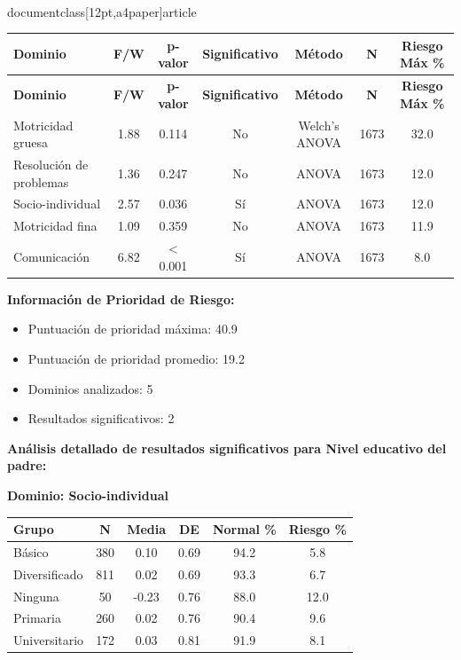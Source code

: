 \\documentclass[12pt,a4paper]{article}
\begin{document}
\begin{longtable}{|l|c|c|c|c|c|c|}
\hline
\textbf{Dominio} & \textbf{F/W} & \textbf{p-valor} & \textbf{Significativo} & \textbf{Método} & \textbf{N} & \textbf{Riesgo Máx \%} \\
\hline
\endfirsthead

\hline
\textbf{Dominio} & \textbf{F/W} & \textbf{p-valor} & \textbf{Significativo} & \textbf{Método} & \textbf{N} & \textbf{Riesgo Máx \%} \\
\hline
\endhead

\hline
\endfoot

\hline
\endlastfoot

Motricidad gruesa & 1.88 & 0.114 & No & Welch's ANOVA & 1673 & 32.0 \\
Resolución de problemas & 1.36 & 0.247 & No & ANOVA & 1673 & 12.0 \\
Socio-individual & 2.57 & 0.036 & Sí & ANOVA & 1673 & 12.0 \\
Motricidad fina & 1.09 & 0.359 & No & ANOVA & 1673 & 11.9 \\
Comunicación & 6.82 & < 0.001 & Sí & ANOVA & 1673 & 8.0 \\

\end{longtable}


\textbf{Información de Prioridad de Riesgo:}
\begin{itemize}
\item Puntuación de prioridad máxima: 40.9
\item Puntuación de prioridad promedio: 19.2
\item Dominios analizados: 5
\item Resultados significativos: 2
\end{itemize}


\textbf{Análisis detallado de resultados significativos para Nivel educativo del padre:}


\textbf{Dominio: Socio-individual}


\begin{center}
\begin{tabular}{|l|c|c|c|c|c|}
\hline
\textbf{Grupo} & \textbf{N} & \textbf{Media} & \textbf{DE} & \textbf{Normal \%} & \textbf{Riesgo \%} \\
\hline
Básico & 380 & 0.10 & 0.69 & 94.2 & 5.8 \\
Diversificado & 811 & 0.02 & 0.69 & 93.3 & 6.7 \\
Ninguna & 50 & -0.23 & 0.76 & 88.0 & 12.0 \\
Primaria & 260 & 0.02 & 0.76 & 90.4 & 9.6 \\
Universitario & 172 & 0.03 & 0.81 & 91.9 & 8.1 \\

\hline
\end{tabular}
\end{center}
\end{document}
